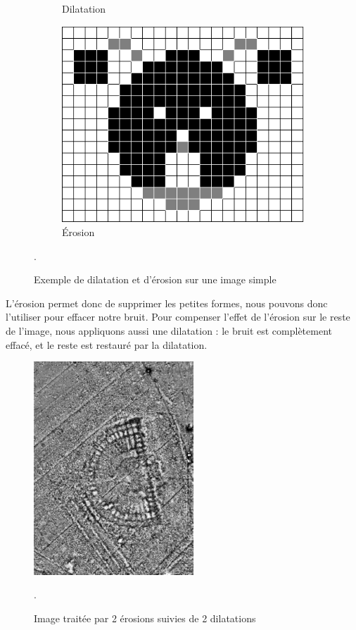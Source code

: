 \documentclass[a4paper, 12pt, titlepage, oneside, french]{article}
\begin{document}
\begin{figure}[H]
\begin{subfigure}[b]{0.3\linewidth}
			\caption{Dilatation}
		\end{subfigure}
		\begin{subfigure}[b]{0.3\linewidth}
			\includegraphics[width=\linewidth]{filter_dilate-erode_ex-erode.png}
			\caption{Érosion}
		\end{subfigure}
		\caption{Exemple de dilatation et d'érosion sur une image simple}. 
		\label{fig:FilterDilateErodeEx}
	\end{figure}
	L'érosion permet donc de supprimer les petites formes, nous pouvons donc l'utiliser pour effacer notre bruit.
	Pour compenser l'effet de l'érosion sur le reste de l'image, nous appliquons aussi une dilatation : le bruit est complètement effacé, et le reste est restauré par la dilatation.

	\begin{figure}[H]
		\centering
		\includegraphics[width=6cm]{filter_dilate-erode.png}
		\caption{Image traitée par 2 érosions suivies de 2 dilatations}. 
		\label{fig:FilterDilateErode}
	\end{figure}
\end{document}
